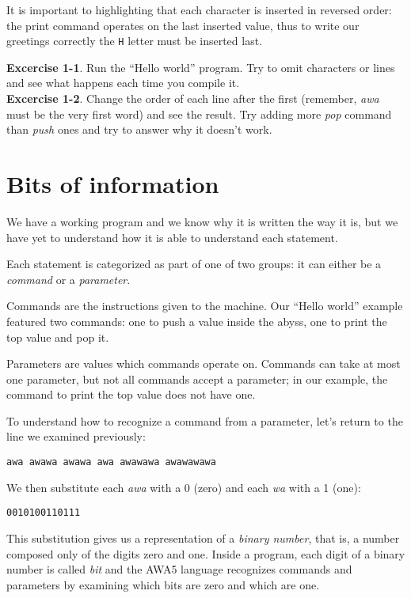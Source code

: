 \documentclass[11pt,a4paper,draft]{book}
\begin{document}
It is important to highlighting that each character is inserted in
reversed order: the print command operates on the last inserted value,
thus to write our greetings correctly the \verb|H| letter must be
inserted last.

\textbf{Excercise 1-1}. Run the \enquote{Hello world} program. Try to
omit characters or lines and see what happens each time you compile
it. \\
\textbf{Excercise 1-2}. Change the order of each line after the first
(remember, \emph{awa} must be the very first word) and see the
result. Try adding more \emph{pop} command than \emph{push} ones and
try to answer why it doesn't work.

\section{Bits of information}
We have a working program and we know why it is written the way it is,
but we have yet to understand how it is able to understand each
statement.

Each statement is categorized as part of one of two groups: it can
either be a \emph{command} or a \emph{parameter}.

Commands are the instructions given to the machine. Our \enquote{Hello
  world} example featured two commands: one to push a value inside the
abyss, one to print the top value and pop it.

Parameters are values which commands operate on. Commands can take at
most one parameter, but not all commands accept a parameter; in our
example, the command to print the top value does not have one.

To understand how to recognize a command from a parameter, let's
return to the line we examined previously:
\begin{verbatim}
awa awawa awawa awa awawawa awawawawa
\end{verbatim}

We then substitute each \emph{awa} with a 0 (zero) and each \emph{wa}
with a 1 (one):
\begin{verbatim}
0010100110111
\end{verbatim}

This substitution gives us a representation of a \emph{binary number},
that is, a number composed only of the digits zero and one. Inside a
program, each digit of a binary number is called \emph{bit} and the
AWA5 language recognizes commands and parameters by examining which
bits are zero and which are one.
\end{document}
